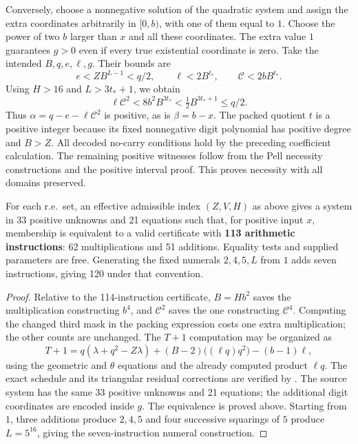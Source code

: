Conversely, choose a nonnegative solution of the quadratic system and
assign the extra coordinates arbitrarily in $[0,b)$, with one of them
equal to $1$. Choose the power of two $b$ larger than $x$ and all these
coordinates. The extra value $1$ guarantees $g>0$ even if every true
existential coordinate is zero. Take the intended $B,q,e,\ell,g$.
Their bounds are
\[
 e<ZB^{L-1}<q/2,\qquad
 \ell<2B^{t_*},\qquad
 \mathcal C<2bB^{t_*}.
\]
Using $H>16$ and $L>3t_*+1$, we obtain
\[
 \ell\mathcal C^2<8b^2B^{3t_*}
      <\tfrac12B^{3t_*+1}\le q/2.
\]
Thus $\alpha=q-e-\ell\mathcal C^2$ is positive, as is $\beta=b-x$.
The packed quotient $t$ is a positive integer because its fixed
nonnegative digit polynomial has positive degree and $B>Z$.
All decoded no-carry conditions hold by the preceding coefficient
calculation. The remaining positive witnesses follow from the Pell
necessity constructions and the positive interval proof. This proves
necessity with all domains preserved.

\begin{theorem}\label{thm:best113}
For each r.e.\ set, an effective admissible index $(Z,V,H)$ as above
gives a system in 33 positive unknowns and 21 equations such that, for
positive input $x$, membership is equivalent to a valid certificate with
\textbf{113 arithmetic instructions}: 62 multiplications and 51 additions.
Equality tests and supplied parameters are free. Generating the fixed
numerals $2,4,5,L$ from $1$ adds seven instructions, giving 120 under
that convention.
\end{theorem}
\begin{proof}
Relative to the 114-instruction certificate, $B=Hb^2$ saves the
multiplication constructing $b^4$, and $\mathcal C^2$ saves the one
constructing $\mathcal C^4$. Computing the changed third mask in the
packing expression costs one extra multiplication; the other counts
are unchanged. The $T+1$ computation may be organized as
\[
 T+1=q(\lambda+q^2-Z\lambda)
      +(B-2)\bigl((\ell q)q^2\bigr)-(b-1)\ell,
\]
using the geometric and $\theta$ equations and the already computed
product $\ell q$. The exact schedule and
its triangular residual corrections are verified by
.
The source system has the same 33 positive unknowns and 21 equations;
the additional digit coordinates are encoded inside $g$.
The equivalence is proved above. Starting from $1$, three additions
produce $2,4,5$ and four successive squarings of $5$ produce $L=5^{16}$,
giving the seven-instruction numeral construction.
\end{proof}
